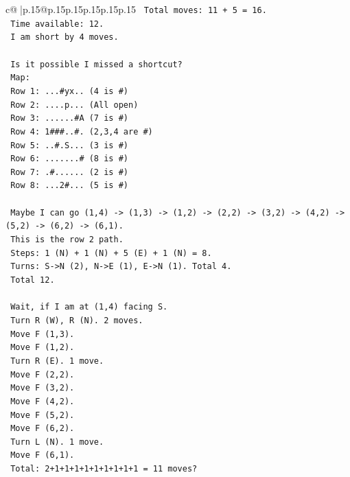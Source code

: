 \documentclass{article}
\begin{document}
{\begin{supertabular}{c@{$\;$}|p{.15\linewidth}@{}p{.15\linewidth}p{.15\linewidth}p{.15\linewidth}p{.15\linewidth}p{.15\linewidth}}
{{{\texttt{   Total moves: 11 + 5 = 16.} \\
\texttt{   Time available: 12.} \\
\texttt{   I am short by 4 moves.} \\
\\ 
\texttt{   Is it possible I missed a shortcut?} \\
\texttt{   Map:} \\
\texttt{   Row 1: ...\#yx.. (4 is \#)} \\
\texttt{   Row 2: ....p... (All open)} \\
\texttt{   Row 3: ......\#A (7 is \#)} \\
\texttt{   Row 4: 1\#\#\#..\#. (2,3,4 are \#)} \\
\texttt{   Row 5: ..\#.S... (3 is \#)} \\
\texttt{   Row 6: .......\# (8 is \#)} \\
\texttt{   Row 7: .\#...... (2 is \#)} \\
\texttt{   Row 8: ...2\#... (5 is \#)} \\
\\ 
\texttt{   Maybe I can go (1,4) {-}> (1,3) {-}> (1,2) {-}> (2,2) {-}> (3,2) {-}> (4,2) {-}> (5,2) {-}> (6,2) {-}> (6,1).} \\
\texttt{   This is the row 2 path.} \\
\texttt{   Steps: 1 (N) + 1 (N) + 5 (E) + 1 (N) = 8.} \\
\texttt{   Turns: S{-}>N (2), N{-}>E (1), E{-}>N (1). Total 4.} \\
\texttt{   Total 12.} \\
\\ 
\texttt{   Wait, if I am at (1,4) facing S.} \\
\texttt{   Turn R (W), R (N). 2 moves.} \\
\texttt{   Move F (1,3).} \\
\texttt{   Move F (1,2).} \\
\texttt{   Turn R (E). 1 move.} \\
\texttt{   Move F (2,2).} \\
\texttt{   Move F (3,2).} \\
\texttt{   Move F (4,2).} \\
\texttt{   Move F (5,2).} \\
\texttt{   Move F (6,2).} \\
\texttt{   Turn L (N). 1 move.} \\
\texttt{   Move F (6,1).} \\
\texttt{   Total: 2+1+1+1+1+1+1+1+1+1 = 11 moves?} \\
}}}
\end{supertabular}}
\end{document}
